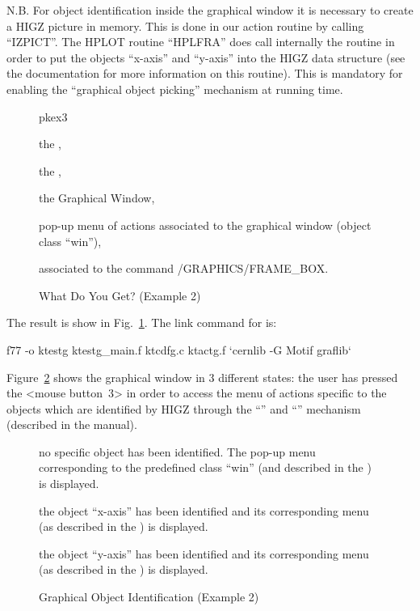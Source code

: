 N.B. For object identification inside the graphical window it is necessary 
to create a HIGZ picture in memory. This is done in our action routine by
calling ``IZPICT''. The HPLOT routine ``HPLFRA'' does call internally 
the \HIGZ{} routine \IGPID{} in 
order to put the objects ``x-axis'' and ``y-axis'' into the HIGZ data
structure (see the \HIGZ{} documentation for more information on this
routine). This is mandatory for enabling the  ``graphical object picking'' 
mechanism at running time.

\begin{figure}[htb]
\hfill
\begin{PICTf}[.8]{pkex3}
\end{PICTf}
\hfill
\begin{EnumZB}
\item the \EW{},
\item the \MB{},
\item the \HIGZ{} Graphical Window,
\item pop-up menu of actions associated to the graphical window (object class
``win''),
\item \CAP{} associated to the command /GRAPHICS/FRAME\_BOX.
\vspace{-1\baselineskip}
\end{EnumZB}
\caption{What Do You Get? (Example 2)}
\label{ref:FIGPKEX3}
\end{figure}

The result is show in Fig.~\ref{ref:FIGPKEX3}.
The link command for  is:
\begin{XMP}
f77 -o ktestg ktestg_main.f ktcdfg.c ktactg.f `cernlib -G Motif graflib`
\end{XMP}

Figure~\ref{ref:FIGPKEX4} shows the graphical window in
3 different states: the user has pressed the <mouse button~3> in order
to access the menu of actions specific to the objects which are identified
by HIGZ through the ``\IGOBJ{}'' and ``\IGPID{}'' mechanism (described in 
the \HIGZ{} manual).

\begin{figure}[htb]
\vspace{-1\baselineskip}
\vspace{-1\baselineskip}
\begin{EnumZB}
\item  no specific object has been identified. The pop-up menu corresponding
to the predefined class ``win'' (and described in the \CDF{}) is displayed.
\item the object ``x-axis'' has been identified and its corresponding
menu (as described in the \CDF{}) is displayed.
\item the object ``y-axis'' has been identified and its corresponding
menu (as described in the \CDF{}) is displayed.
\vspace{-1.5\baselineskip}
\end{EnumZB}
\caption{Graphical Object Identification (Example 2)}
\label{ref:FIGPKEX4}
\end{figure}

